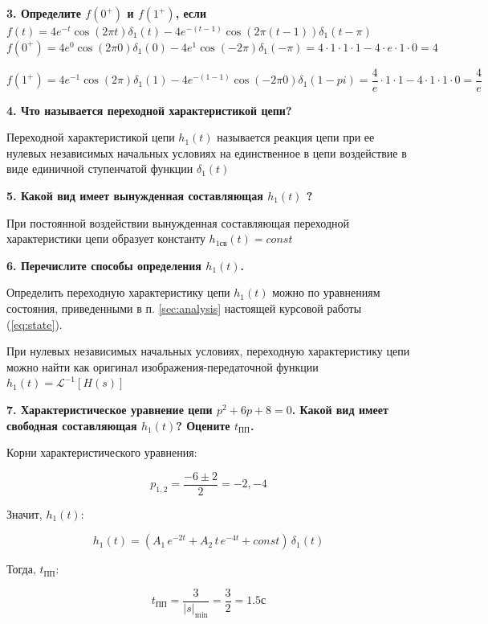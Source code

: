 \textbf{
    3. Определите $ f(0^+) $ и $ f(1^+) $, если \\
    $ f(t) = 
    4 e^{- t    } \cos(2 \pi t    ) \delta_1(t) -
    4 e^{- (t-1)} \cos(2 \pi (t-1)) \delta_1(t-\pi)
    $
}\\

$ f(0^+) = 
4 e^{0} \cos( 2 \pi 0) \delta_{1}(0   ) - 
4 e^{1} \cos(-2 \pi  ) \delta_{1}(-\pi) = 
4 \cdot 1 \cdot 1 \cdot 1 - 
4 \cdot e \cdot 1 \cdot 0 = 
4
$

$ f(1^+) = 
4 e^{-1    } \cos(2  \pi  ) \delta_{1}(1)    - 
4 e^{-(1-1)} \cos(-2 \pi 0) \delta_{1}(1-pi) =
\dfrac{4}{e} \cdot 1 \cdot 1 - 
4 \cdot 1 \cdot 1 \cdot 0 = 
\dfrac{4}{e} 
$

\textbf{
    4. Что называется переходной характеристикой цепи?
}

Переходной характеристикой цепи $ h_{1}(t) $ называется реакция цепи при ее нулевых независимых начальных условиях на единственное в цепи воздействие в виде единичной ступенчатой функции $ \delta_{1}(t) $

\textbf{
    5. Какой вид имеет вынужденная составляющая $ h_{1}(t) $ ?
}

При постоянной воздействии вынужденная составляющая переходной характеристики цепи образует константу $ h_{1св}(t) = const $ 

\textbf{
    6. Перечислите способы определения $ h_{1}(t) $.
}

Определить переходную характеристику цепи 
$ h_{1}(t) $ можно по уравнениям состояния, 
приведенными в п. \ref{sec:analysis} 
настоящей курсовой работы
(\ref{eq:state}).

При нулевых независимых начальных условиях, 
переходную характеристику цепи 
можно найти как 
оригинал изображения-передаточной функции 
$ h_{1}(t) = \mathcal{L}^{-1}[H(s)] $

\textbf{
    7. Характеристическое уравнение цепи 
    $ p^{2} + 6p + 8 = 0 $. 
    Какой вид имеет свободная составляющая $ h_{1}(t) $?
    Оцените $ t_{ПП} $.
}

Корни характеристического уравнения:

$$ p_{1,2} = \dfrac{-6 \pm 2}{2} = -2, -4 $$

Значит, $ h_{1}(t) $:

$$ 
h_{1}(t) = (
    A_{1} \, e^{-2t} + 
    A_{2} \, t \, e^{-4t} + 
    const
) \, \delta_{1}(t) $$

Тогда, $ t_{ПП} $:

$$ t_{ПП} = \dfrac{3}{|s|_{\min}} = \dfrac{3}{2} = 1.5 с $$


